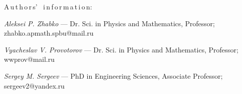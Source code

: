 {\vskip 6mm


A\,u\,t\,h\,o\,r\,s' \ i\,n\,f\,o\,r\,m\,a\,t\,i\,o\,n:


\vskip 2mm
 \textit{Aleksei P. Zhabko} --- Dr. Sci. in Physics and Mathematics, Professor; zhabko.apmath.spbu@mail.ru \par


\vskip 2mm
 \textit{Vyacheslav V. Provotorov} --- Dr. Sci. in Physics and Mathematics, Professor; wwprov@mail.ru \par


\vskip 2mm
 \textit{Sergey M. Sergeev} ---  PhD  in Engineering Sciences, Associate Professor;   sergeev2@yandex.ru
 \par
%
%
}
